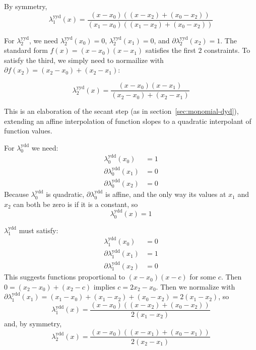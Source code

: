 By symmetry, 
\begin{equation}
\lambda^{\text{yyd}}_1(x) = 
\frac 
{(x - x_0) \left( (x - x_2) + (x_0 - x_2) \right)} 
{(x_1 - x_0) \left( (x_1 - x_2) + (x_0 - x_2) \right)}
\end{equation}

 For $\lambda^{\text{yyd}}_2$, we need 
$\lambda^{\text{yyd}}_2(x_0) = 0$, 
$\lambda^{\text{yyd}}_2(x_1) = 0$, and
$\partial\lambda^{\text{yyd}}_2(x_2) = 1$. 
The standard form $f(x) = (x-x_0) (x-x_1)$ satisfies the first 
$2$ constraints. 
To satisfy the third, we simply need to normailize with
$\partial{f}(x_2) = (x_2 - x_0) + (x_2 - x_1)$:

\begin{equation}
\lambda^{\text{yyd}}_2(x) = 
\frac 
{(x - x_0) (x - x_1)} 
{(x_2 - x_0) + (x_2 - x_1)}
\end{equation}

\label{sec:lagrange-dyd}

This is an elaboration of the secant step 
(as in section~\ref{sec:monomial-dyd}),
extending an affine interpolation of function slopes
to a quadratic interpolant of function values.

For $\lambda^{\text{ydd}}_0$ we need:
\begin{align}
\lambda^{\text{ydd}}_0(x_0) & = 1 \\
\partial\lambda^{\text{ydd}}_0(x_1) & = 0 \nonumber \\
\partial\lambda^{\text{ydd}}_0(x_2) & = 0 \nonumber
\end{align}
Because $\lambda^{\text{ydd}}_0$ is quadratic,
$\partial\lambda^{\text{ydd}}_0$ is affine, 
and the only way its values
at $x_1$ and $x_2$ can both be zero is if it is a constant, so 
\begin{equation}
\lambda^{\text{ydd}}_0(x) = 1
\end{equation}

$\lambda^{\text{ydd}}_1$ must satisfy:
\begin{align}
\lambda^{\text{ydd}}_1(x_0) & = 0 \\
\partial\lambda^{\text{ydd}}_1(x_1) & = 1 \nonumber \\
\partial\lambda^{\text{ydd}}_1(x_2) & = 0 \nonumber
\end{align}
This suggests functions proportional to $(x - x_0) (x - c)$ 
for some $c$. Then 
$ 0 = (x_2 - x_0) + (x_2 - c)$
implies $ c = 2 x_2 - x_0$.
Then we normalize with 
$\partial\lambda^{\text{ydd}}_1(x_1) = (x_1 - x_0) + (x_1 - x_2) + (x_0 - x_2) 
= 2 (x_1 - x_2)$, so 
\begin{equation}
\lambda^{\text{ydd}}_1(x) = 
\frac {(x - x_0) \left((x - x_2) + (x_0 - x_2)\right)} 
{2 (x_1 - x_2)}
\end{equation}
and, by symmetry,
\begin{equation}
\lambda^{\text{ydd}}_2(x) = 
\frac {(x - x_0) \left( (x -x_1) + (x_0 - x_1) \right)} 
{2 (x_2 - x_1)}
\end{equation}

